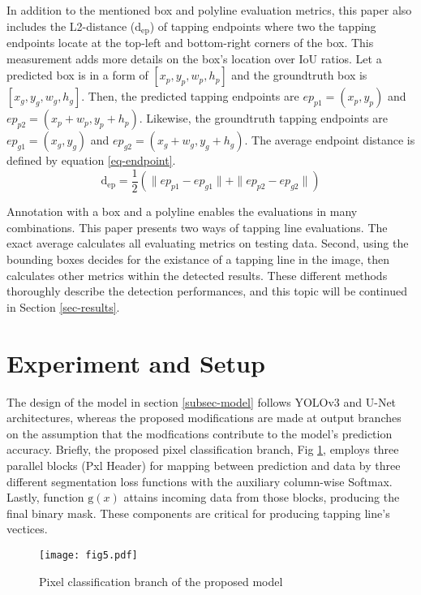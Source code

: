 \documentclass[default,pdflatex,iicol]{sn-jnl}%
\begin{document}
In addition to the mentioned box and polyline evaluation metrics, this paper also includes the L2-distance ($\mathrm{d_{ep}}$) of tapping endpoints where two the tapping endpoints locate at the top-left and bottom-right corners of the box. This measurement adds more details on the box's location over IoU ratios. Let a predicted box is in a form of $[x_p, y_p, w_p, h_p]$ and the groundtruth box is $[x_g, y_g, w_g, h_g]$. Then, the predicted tapping endpoints are $ep_{p1} = (x_p, y_p)$ and $ep_{p2} = (x_p+w_p, y_p+h_p)$. Likewise, the groundtruth tapping endpoints are $ep_{g1} = (x_g, y_g)$ and $ep_{g2} = (x_g+w_g, y_g+h_g)$. The average endpoint distance is defined by equation \ref{eq-endpoint}.
\begin{equation}
\mathrm{d_{ep}} = \frac{1}{2} (\| ep_{p1}- ep_{g1} \| + \| ep_{p2}  - ep_{g2} \|) \label{eq-endpoint}
\end{equation}

Annotation with a box and a polyline enables the evaluations in many combinations. This paper presents two ways of tapping line evaluations. The exact average calculates all evaluating metrics on testing data. Second, using the bounding boxes decides for the existance of a tapping line in the image, then calculates other metrics within the detected results. These different methods thoroughly describe the detection performances, and this topic will be continued in Section \ref{sec-results}.

\section{Experiment and Setup}
The design of the model in section \ref{subsec-model} follows YOLOv3 and U-Net architectures, whereas the proposed modifications are made at output branches on the assumption that the modfications contribute to the model's prediction accuracy. Briefly, the proposed pixel classification branch, Fig \ref{fig5-proposedPxlHeader}, employs three parallel blocks (Pxl Header) for mapping between prediction and data by three different segmentation loss functions with the auxiliary column-wise Softmax. Lastly, function $\mathrm{g}(x)$ attains incoming data from those blocks, producing the final binary mask. These components are critical for producing tapping line's vectices.

\begin{figure}[h]%
\centering
\texttt{[image: fig5.pdf]}
\caption{Pixel classification branch of the proposed model}\label{fig5-proposedPxlHeader}
\end{figure}
\end{document}
